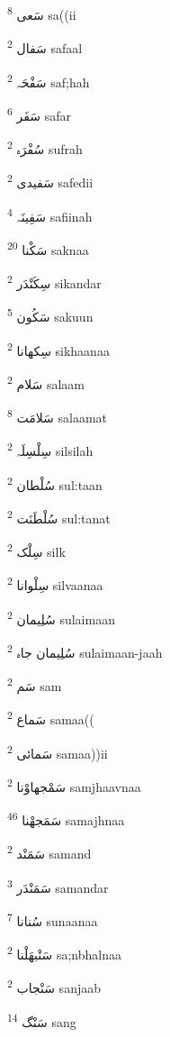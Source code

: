 \documentclass[12pt]{article}
\begin{document}
\begin{RTL}
\begin{multicols}{5}
{\ur سَعی}   \textsuperscript{8} sa((ii

{\ur سَفال}   \textsuperscript{2} safaal

{\ur سَفْحَہ}   \textsuperscript{2} saf;hah

{\ur سَفَر}   \textsuperscript{6} safar

{\ur سُفْرَہ}   \textsuperscript{2} sufrah

{\ur سَفیدی}   \textsuperscript{2} safedii

{\ur سَفِینَہ}   \textsuperscript{4} safiinah

{\ur سَکْنا}   \textsuperscript{20} saknaa

{\ur سِکَنْدَر}   \textsuperscript{2} sikandar

{\ur سَکُون}   \textsuperscript{5} sakuun

{\ur سِکھانا}   \textsuperscript{2} sikhaanaa

{\ur سَلام}   \textsuperscript{2} salaam

{\ur سَلامَت}   \textsuperscript{8} salaamat

{\ur سِلْسِلَہ}   \textsuperscript{2} silsilah

{\ur سُلْطان}   \textsuperscript{2} sul:taan

{\ur سُلْطَنَت}   \textsuperscript{2} sul:tanat

{\ur سِلْک}   \textsuperscript{2} silk

{\ur سِلْوانا}   \textsuperscript{2} silvaanaa

{\ur سُلِیمان}   \textsuperscript{2} sulaimaan

{\ur سُلِیمان جاہ}   \textsuperscript{2} sulaimaan-jaah

{\ur سَم}   \textsuperscript{2} sam

{\ur سَماع}   \textsuperscript{2} samaa((

{\ur سَمائی}   \textsuperscript{2} samaa))ii

{\ur سَمْجھاوْنا}   \textsuperscript{2} samjhaavnaa

{\ur سَمَجھْنا}   \textsuperscript{46} samajhnaa

{\ur سَمَنْد}   \textsuperscript{2} samand

{\ur سَمَنْدَر}   \textsuperscript{3} samandar

{\ur سُنانا}   \textsuperscript{7} sunaanaa

{\ur سَنْبھَلْنا}   \textsuperscript{2} sa;nbhalnaa

{\ur سَنْجاب}   \textsuperscript{2} sanjaab

{\ur سَنْگ}   \textsuperscript{14} sang


\end{multicols}
\end{RTL}
\end{document}
